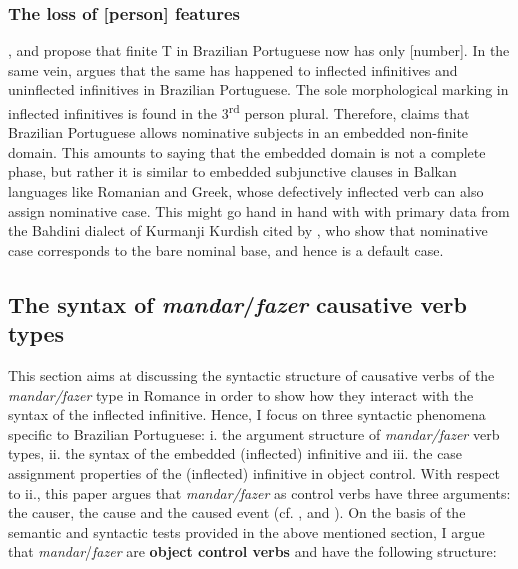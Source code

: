 \documentclass[output=paper]{langsci/langscibook}
\begin{document}
    \z



\subsubsection{The loss of [person] features}%

\citet{Nunes2008}, \citet{Ferreira2009} and \citet{Rodrigues2004} propose that finite T in Brazilian Portuguese now has only [number]. In the same vein, \citet{Cyrino2010} argues that the same has happened to inflected infinitives and uninflected infinitives in Brazilian Portuguese. The sole morphological marking in inflected infinitives is found in the 3\textsuperscript{rd} person plural. Therefore, \citet{Cyrino2010} claims that Brazilian Portuguese allows nominative subjects in an embedded non-finite domain. This amounts to saying that the embedded domain is not a complete phase, but rather it is similar to embedded subjunctive clauses in Balkan languages like Romanian and Greek, whose defectively inflected verb can also assign nominative case. This might go hand in hand with with primary data from the Bahdini dialect of Kurmanji Kurdish cited by \citet{ManziniEtAl2015}, who show that nominative case corresponds to the bare nominal base, and hence is a default case.  

\subsection{The syntax of \textit{mandar}/\textit{fazer} causative verb types} %

This section aims at discussing the syntactic structure of causative verbs of the \textit{mandar/fazer} type in Romance in order to show how they interact with the syntax of the inflected infinitive.\textbf{ }Hence, I focus on three syntactic phenomena specific to Brazilian Portuguese: i. the argument structure of \textit{mandar/fazer}\textbf{ }verb types, ii. the syntax of the embedded (inflected) infinitive and iii.\textbf{ }the case assignment properties of the (inflected) infinitive in object control. With respect to ii., this paper argues that \textit{mandar/fazer} as control verbs have three arguments: the causer, the cause and the caused event (cf. \citealt{Zubizarreta1985}, \citealt{Alsina1992} and \citealt{Ippolito2000}). On the basis of the semantic and syntactic tests provided in the above mentioned section, I argue that \textit{mandar}/\textit{fazer} are \textbf{object control verbs} and have the following structure:
\end{document}
